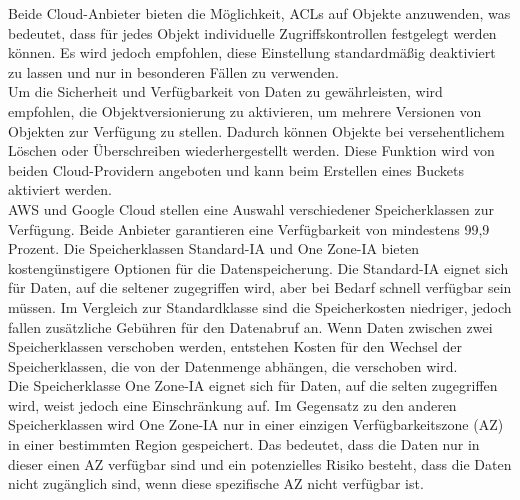 Beide Cloud-Anbieter bieten die Möglichkeit, ACLs auf Objekte anzuwenden, was bedeutet, dass für jedes Objekt individuelle Zugriffskontrollen festgelegt werden können. Es wird jedoch empfohlen, diese Einstellung standardmäßig deaktiviert zu lassen und nur in besonderen Fällen zu verwenden.\\


Um die Sicherheit und Verfügbarkeit von Daten zu gewährleisten, wird empfohlen, die Objektversionierung zu aktivieren, um mehrere Versionen von Objekten zur Verfügung zu stellen. Dadurch können Objekte bei versehentlichem Löschen oder Überschreiben wiederhergestellt werden. Diese Funktion wird von beiden Cloud-Providern angeboten und kann beim Erstellen eines Buckets aktiviert werden.\\

AWS und Google Cloud stellen eine Auswahl verschiedener Speicherklassen zur Verfügung. Beide Anbieter garantieren eine Verfügbarkeit von mindestens 99,9 Prozent. Die Speicherklassen Standard-IA und One Zone-IA bieten kostengünstigere Optionen für die Datenspeicherung. Die Standard-IA eignet sich für Daten, auf die seltener zugegriffen wird, aber bei Bedarf schnell verfügbar sein müssen. Im Vergleich zur Standardklasse sind die Speicherkosten niedriger, jedoch fallen zusätzliche Gebühren für den Datenabruf an. Wenn Daten zwischen zwei Speicherklassen verschoben werden, entstehen Kosten für den Wechsel der Speicherklassen, die von der Datenmenge abhängen, die verschoben wird.\\

Die Speicherklasse One Zone-IA eignet sich für Daten, auf die selten zugegriffen wird, weist jedoch eine Einschränkung auf. Im Gegensatz zu den anderen Speicherklassen wird One Zone-IA nur in einer einzigen Verfügbarkeitszone (AZ) in einer bestimmten Region gespeichert. Das bedeutet, dass die Daten nur in dieser einen AZ verfügbar sind und ein potenzielles Risiko besteht, dass die Daten nicht zugänglich sind, wenn diese spezifische AZ nicht verfügbar ist.\\

